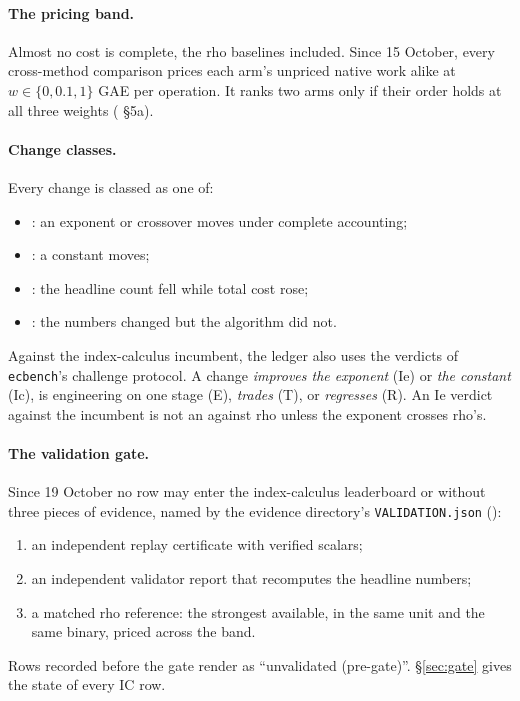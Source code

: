 \paragraph{The pricing band.} Almost no cost is complete, the rho baselines
included. Since 15 October, every cross-method comparison prices each arm's
unpriced native work alike at $w\in\{0,0.1,1\}$ GAE per operation. It ranks
two arms only if their order holds at all three weights (
\S5a).

\paragraph{Change classes.} Every change is classed as one of:
\begin{itemize}
\item {}: an exponent or crossover moves under complete
  accounting;
\item {}: a constant moves;
\item {}: the headline count fell while total cost rose;
\item {}: the numbers changed but the algorithm did not.
\end{itemize}
Against the index-calculus incumbent, the ledger also uses the verdicts of
\texttt{ecbench}'s challenge protocol. A change \emph{improves the exponent}
(Ie) or \emph{the constant} (Ic), is engineering on one stage (E),
\emph{trades} (T), or \emph{regresses} (R). An Ie verdict against the
incumbent is not an  against rho unless the exponent crosses
rho's.

\paragraph{The validation gate.} Since 19 October no row may enter the
index-calculus leaderboard or  without three
pieces of evidence, named by the evidence directory's \texttt{VALIDATION.json}
():
\begin{enumerate}
\item an independent replay certificate with verified scalars;
\item an independent validator report that recomputes the headline numbers;
\item a matched rho reference: the strongest available, in the same unit
  and the same binary, priced across the band.
\end{enumerate}
Rows recorded before the gate render as ``unvalidated (pre-gate)''.
\S\ref{sec:gate} gives the state of every IC row.
